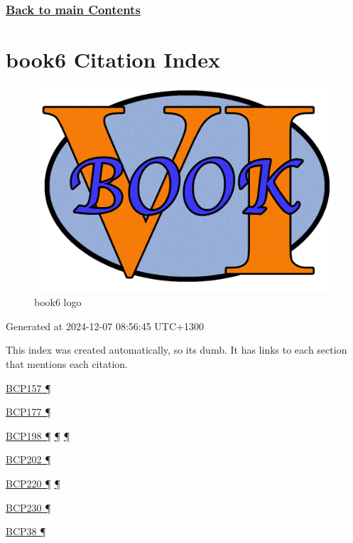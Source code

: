 \documentclass[
]{article}
\begin{document}
\subsubsection{\texorpdfstring{\hyperref[list-of-contents]{Back to main
Contents}}{Back to main Contents}}\label{back-to-main-contents-12}

\pagebreak

\section{book6 Citation Index}\label{book6-citation-index}

\begin{figure}
\centering
\includegraphics{book6logo.png}
\caption{book6 logo}
\end{figure}

Generated at 2024-12-07 08:56:45 UTC+1300

This index was created automatically, so it\textquotesingle s dumb. It
has links to each section that mentions each citation.

\hyperref[addresses]{BCP157 ¶}

\hyperref[coexistence-with-legacy-ipv4]{BCP177 ¶}

\hyperref[addresses]{BCP198 ¶} \hyperref[routing]{¶}
\hyperref[markdown-usage]{¶}

\hyperref[energy-consumption]{BCP202 ¶}

\hyperref[ipv6-basic-technology]{BCP220 ¶} \hyperref[further-reading]{¶}

\hyperref[extension-headers-and-options]{BCP230 ¶}

\hyperref[filtering]{BCP38 ¶}
\end{document}
